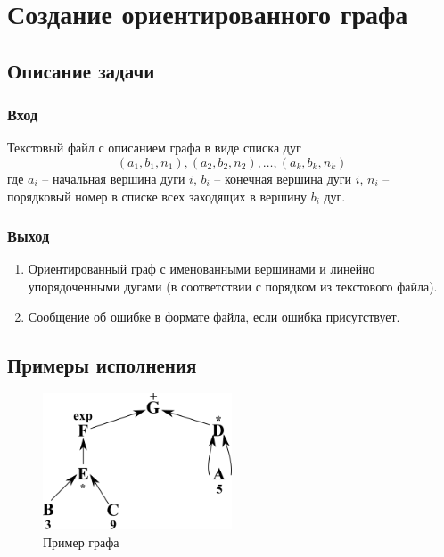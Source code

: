 \documentclass[bachelor, och, pract_otchet]{SCWorks}
\begin{document}



\tableofcontents

\section{Создание ориентированного графа}
\subsection{Описание задачи}
\subsubsection{Вход} 
Текстовый файл с описанием графа в виде списка дуг
\[ (a_1, b_1, n_1), (a_2, b_2, n_2), \dots, (a_k, b_k, n_k) \]
где $a_i$ -- начальная вершина дуги $i$, $b_i$ -- конечная вершина дуги $i$,
$n_i$ -- порядковый номер в списке всех заходящих в вершину $b_i$ дуг.

\subsubsection{Выход}
\begin{enumerate}
  \item Ориентированный граф с именованными вершинами и линейно упорядоченными дугами 
  (в соответствии с порядком из текстового файла).
  \item Сообщение об ошибке в формате файла, если ошибка присутствует.
\end{enumerate}

\subsection{Примеры исполнения}
\begin{figure}[H]
    \centering
    \includegraphics[width=0.5\textwidth]{img/btest1.png}
    \caption{Пример графа}
    \label{1}
\end{figure}
\end{document}
